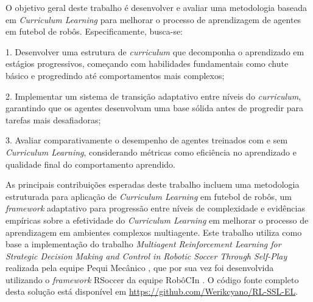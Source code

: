 O objetivo geral deste trabalho é desenvolver e avaliar uma metodologia baseada em \textit{Curriculum Learning} para melhorar o processo de aprendizagem de agentes em futebol de robôs. Especificamente, busca-se:

1. Desenvolver uma estrutura de \textit{curriculum} que decomponha o aprendizado em estágios progressivos, começando com habilidades fundamentais como chute básico e progredindo até comportamentos mais complexos;

2. Implementar um sistema de transição adaptativo entre níveis do \textit{curriculum}, garantindo que os agentes desenvolvam uma base sólida antes de progredir para tarefas mais desafiadoras;

3. Avaliar comparativamente o desempenho de agentes treinados com e sem \textit{Curriculum Learning}, considerando métricas como eficiência no aprendizado e qualidade final do comportamento aprendido.

As principais contribuições esperadas deste trabalho incluem uma metodologia estruturada para aplicação de \textit{Curriculum Learning} em futebol de robôs, um \textit{framework} adaptativo para progressão entre níveis de complexidade e evidências empíricas sobre a efetividade do \textit{Curriculum Learning} em melhorar o processo de aprendizagem em ambientes complexos multiagente. Este trabalho utiliza como base a implementação \cite{framework_pequi_rSoccer} do trabalho \textit{Multiagent Reinforcement Learning for Strategic Decision Making and Control in Robotic Soccer Through Self-Play} \cite{bruno_brandao} realizada pela equipe Pequi Mecânico \cite{pequi_mecanico}, que por sua vez foi desenvolvida utilizando o \textit{framework} RSoccer \cite{rSoccer} da equipe RobôCIn \cite{robocin}. O código fonte completo desta solução está disponível em \url{https://github.com/Werikcyano/RL-SSL-EL}.

